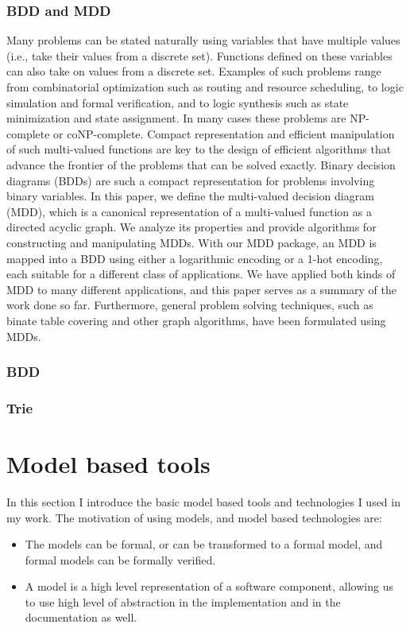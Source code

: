 \subsubsection{BDD and MDD}

Many problems can be stated naturally using variables that have multiple values (i.e., take their values from a discrete set). Functions defined on these variables can also take on values from a discrete set. Examples of such problems range from combinatorial optimization such as routing and resource scheduling, to logic simulation and formal verification, and to logic synthesis such as state minimization and state assignment. In many cases these problems are NP-complete or coNP-complete. Compact representation and efficient manipulation of such multi-valued functions are key to the design of efficient algorithms that advance the frontier of the problems that can be solved exactly. Binary decision diagrams (BDDs) are such a compact representation for problems involving binary variables. In this paper, we define the multi-valued decision diagram (MDD), which is a canonical representation of a multi-valued function as a directed acyclic graph. We analyze its properties and provide algorithms for constructing and manipulating MDDs. With our MDD package, an MDD is mapped into a BDD using either a logarithmic encoding or a 1-hot encoding, each suitable for a different class of applications. We have applied both kinds of MDD to many different applications, and this paper serves as a summary of the work done so far. Furthermore, general problem solving techniques, such as binate table covering and other graph algorithms, have been formulated using MDDs.\citep{Kam98mdd}

\subsubsection{BDD}


\subsubsection{Trie}



\section{Model based tools}
In this section I introduce the basic model based tools and technologies I used in my work. The motivation of using models, and model based technologies are:
\begin{itemize}
	\item The models can be formal, or can be transformed to a formal model, and formal models can be formally verified.
	\item A model is a high level representation of a software component, allowing us to use high level of abstraction in the implementation and in the documentation as well.
\end{itemize}

